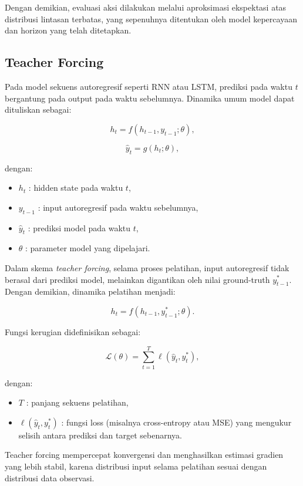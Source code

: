 Dengan demikian, evaluasi aksi dilakukan melalui aproksimasi ekspektasi 
atas distribusi lintasan terbatas, 
yang sepenuhnya ditentukan oleh model kepercayaan dan horizon yang telah ditetapkan.


\subsection{Teacher Forcing}

Pada model sekuens autoregresif seperti RNN atau LSTM,
prediksi pada waktu $t$ bergantung pada output pada waktu sebelumnya.
Dinamika umum model dapat dituliskan sebagai:

\[
h_t = f(h_{t-1}, y_{t-1}; \theta),
\]

\[
\hat{y}_t = g(h_t; \theta),
\]

dengan:
\begin{itemize}
    \item $h_t$ : hidden state pada waktu $t$,
    \item $y_{t-1}$ : input autoregresif pada waktu sebelumnya,
    \item $\hat{y}_t$ : prediksi model pada waktu $t$,
    \item $\theta$ : parameter model yang dipelajari.
\end{itemize}

Dalam skema \textit{teacher forcing}, selama proses pelatihan,
input autoregresif tidak berasal dari prediksi model,
melainkan digantikan oleh nilai ground-truth $y_{t-1}^{*}$.
Dengan demikian, dinamika pelatihan menjadi:

\[
h_t = f(h_{t-1}, y_{t-1}^{*}; \theta).
\]

Fungsi kerugian didefinisikan sebagai:

\begin{equation}
\mathcal{L}(\theta)
=
\sum_{t=1}^{T}
\ell(\hat{y}_t, y_t^{*}),
\end{equation}

dengan:
\begin{itemize}
    \item $T$ : panjang sekuens pelatihan,
    \item $\ell(\hat{y}_t, y_t^{*})$ : fungsi loss (misalnya cross-entropy atau MSE) 
    yang mengukur selisih antara prediksi dan target sebenarnya.
\end{itemize}

Teacher forcing mempercepat konvergensi
dan menghasilkan estimasi gradien yang lebih stabil,
karena distribusi input selama pelatihan
sesuai dengan distribusi data observasi.



